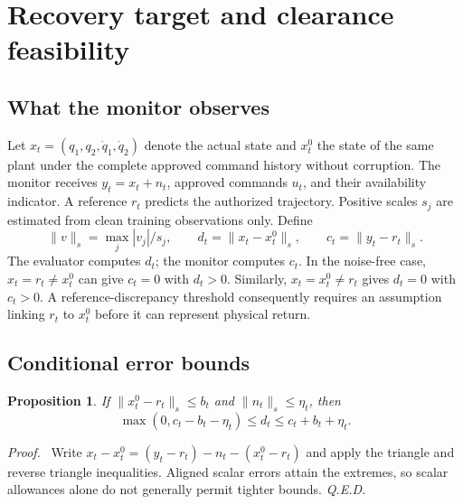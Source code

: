 \documentclass[11pt]{article}
\newtheorem{proposition}{Proposition}
\newenvironment{proof}{\par\noindent\textit{Proof.}\ }{\hfill\textit{Q.E.D.}\par}
\begin{document}
\section{Recovery target and clearance feasibility}
\subsection{What the monitor observes}
Let $x_t=(q_1,q_2,\dot q_1,\dot q_2)$ denote the actual state and $x_t^0$ the state of the same plant under the complete approved command history without corruption. The monitor receives $y_t=x_t+n_t$, approved commands $u_t$, and their availability indicator. A reference $r_t$ predicts the authorized trajectory. Positive scales $s_j$ are estimated from clean training observations only. Define
\begin{equation}
 \|v\|_s=\max_j |v_j|/s_j,\qquad
 d_t=\|x_t-x_t^0\|_s,\qquad c_t=\|y_t-r_t\|_s.
 \label{eq:discrepancies}
\end{equation}
The evaluator computes $d_t$; the monitor computes $c_t$. In the noise-free case, $x_t=r_t\ne x_t^0$ can give $c_t=0$ with $d_t>0$. Similarly, $x_t=x_t^0\ne r_t$ gives $d_t=0$ with $c_t>0$. A reference-discrepancy threshold consequently requires an assumption linking $r_t$ to $x_t^0$ before it can represent physical return.

\subsection{Conditional error bounds}
\begin{proposition}
If $\|x_t^0-r_t\|_s\le b_t$ and $\|n_t\|_s\le\eta_t$, then
\begin{equation}
 \max(0,c_t-b_t-\eta_t)\le d_t\le c_t+b_t+\eta_t.
 \label{eq:bound}
\end{equation}
\end{proposition}
\begin{proof}
Write $x_t-x_t^0=(y_t-r_t)-n_t-(x_t^0-r_t)$ and apply the triangle and reverse triangle inequalities. Aligned scalar errors attain the extremes, so scalar allowances alone do not generally permit tighter bounds.
\end{proof}
\end{document}
